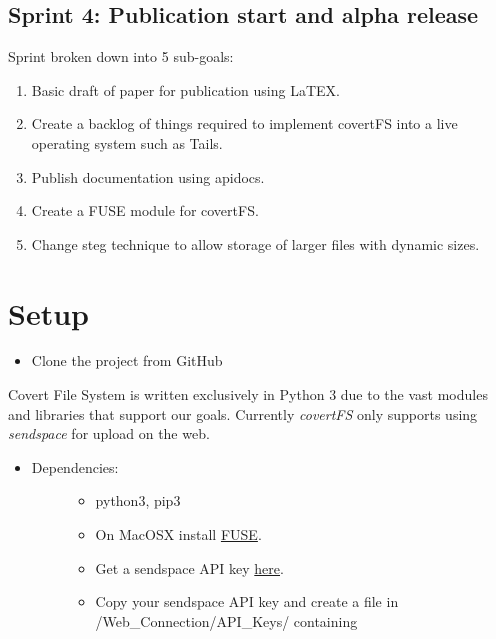 \documentclass[letterpaper,10pt,english]{sphinxmanual}
\begin{document}
\section{Sprint 4: Publication start and alpha release}
\label{index:sprint-4-publication-start-and-alpha-release}
Sprint broken down into 5 sub-goals:
\begin{enumerate}
\item {} 
Basic draft of paper for publication using LaTEX.

\item {} 
Create a backlog of things required to implement covertFS into a live operating system such as Tails.

\item {} 
Publish documentation using apidocs.

\item {} 
Create a FUSE module for covertFS.

\item {} 
Change steg technique to allow storage of larger files with dynamic sizes.

\end{enumerate}


\chapter{Setup}
\label{index:setup}\begin{itemize}
\item {} 
Clone the project from GitHub 

\end{itemize}

Covert File System is written exclusively in Python 3 due to the vast modules and libraries that support our goals. Currently \emph{covertFS} only supports using \emph{sendspace} for upload on the web.
\begin{itemize}
\item {} \begin{description}
\item[{Dependencies:}] \leavevmode\begin{itemize}
\item {} 
python3, pip3 

\item {} 
On MacOSX install \href{https://osxfuse.github.io}{FUSE}.

\item {} 
Get a sendspace API key \href{https://www.sendspace.com/dev\_apikeys.html}{here}.

\item {} 
Copy your sendspace API key and create a file in /Web\_Connection/API\_Keys/ containing 

\end{itemize}

\end{description}

\end{itemize}
\end{document}
